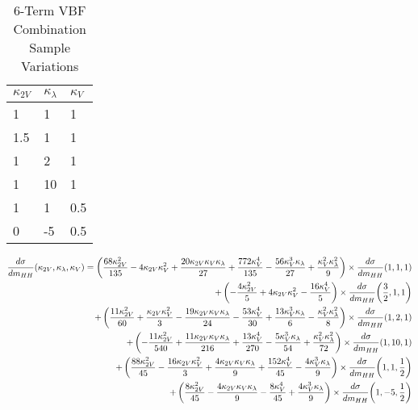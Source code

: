     \begin{table}[] \centering
    \caption{6-Term VBF Combination Sample Variations}
    \label{tab:vbf_hh_6term_varlist}
    \begin{tabular}{ |l|l|l| }
        \hline
        \textbf {$\kappa_{2V}$} & \textbf {$\kappa_\lambda$} & \textbf {$\kappa_V$} \\
        \hline
            1   &   1 & 1   \\
            1.5 &   1 & 1   \\
            1   &   2 & 1   \\
            1   &  10 & 1   \\
            1   &   1 & 0.5 \\
            0   &  -5 & 0.5 \\
        \hline
    \end{tabular} \end{table}

    \begin{equation}
    \label{eqn:vbf_hh_6term_chosen}
    \begin{split}
        \frac{d\sigma}{dm_{HH}}(\kappa_{2V}, \kappa_{\lambda}, \kappa_{V}) =
            \left(\frac{68 \kappa_{2V}^{2}}{135} - 4 \kappa_{2V} \kappa_{V}^{2} + \frac{20 \kappa_{2V} \kappa_{V} \kappa_{\lambda}}{27} + \frac{772 \kappa_{V}^{4}}{135} - \frac{56 \kappa_{V}^{3} \kappa_{\lambda}}{27} + \frac{\kappa_{V}^{2} \kappa_{\lambda}^{2}}{9}\right) \times \frac{d\sigma}{dm_{HH}}{\left(1,1,1 \right)} \\
            + \left(- \frac{4 \kappa_{2V}^{2}}{5} + 4 \kappa_{2V} \kappa_{V}^{2} - \frac{16 \kappa_{V}^{4}}{5}\right) \times \frac{d\sigma}{dm_{HH}}{\left(\frac{3}{2},1,1 \right)} \\
            + \left(\frac{11 \kappa_{2V}^{2}}{60} + \frac{\kappa_{2V} \kappa_{V}^{2}}{3} - \frac{19 \kappa_{2V} \kappa_{V} \kappa_{\lambda}}{24} - \frac{53 \kappa_{V}^{4}}{30} + \frac{13 \kappa_{V}^{3} \kappa_{\lambda}}{6} - \frac{\kappa_{V}^{2} \kappa_{\lambda}^{2}}{8}\right) \times \frac{d\sigma}{dm_{HH}}{\left(1,2,1 \right)} \\
            + \left(- \frac{11 \kappa_{2V}^{2}}{540} + \frac{11 \kappa_{2V} \kappa_{V} \kappa_{\lambda}}{216} + \frac{13 \kappa_{V}^{4}}{270} - \frac{5 \kappa_{V}^{3} \kappa_{\lambda}}{54} + \frac{\kappa_{V}^{2} \kappa_{\lambda}^{2}}{72}\right) \times \frac{d\sigma}{dm_{HH}}{\left(1,10,1 \right)}  \\
            + \left(\frac{88 \kappa_{2V}^{2}}{45} - \frac{16 \kappa_{2V} \kappa_{V}^{2}}{3} + \frac{4 \kappa_{2V} \kappa_{V} \kappa_{\lambda}}{9} + \frac{152 \kappa_{V}^{4}}{45} - \frac{4 \kappa_{V}^{3} \kappa_{\lambda}}{9}\right) \times \frac{d\sigma}{dm_{HH}}{\left(1,1,\frac{1}{2} \right)} \\
            + \left(\frac{8 \kappa_{2V}^{2}}{45} - \frac{4 \kappa_{2V} \kappa_{V} \kappa_{\lambda}}{9} - \frac{8 \kappa_{V}^{4}}{45} + \frac{4 \kappa_{V}^{3} \kappa_{\lambda}}{9}\right) \times \frac{d\sigma}{dm_{HH}}{\left(1,-5,\frac{1}{2} \right)}
    \end{split}
    \end{equation}

